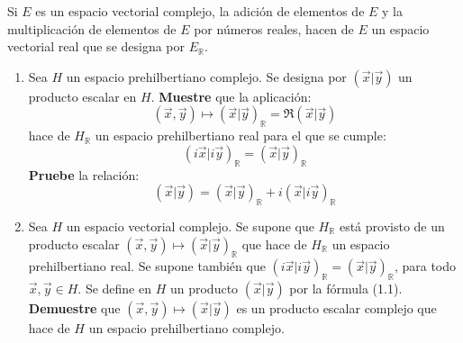 \documentclass[12pt]{report}
\newcounter{it}
\theoremstyle{largebreak}
\newcommand\pint[2]{\ensuremath{\left(#1\big|#2\right)}}
\begin{document}
    \begin{excer}
        Si $E$ es un espacio vectorial complejo, la adición de elementos de $E$ y la multiplicación de elementos de $E$ por números reales, hacen de $E$ un espacio vectorial real que se designa por $E_\mathbb{R}$.
        \begin{enumerate}
            \item Sea $H$ un espacio prehilbertiano complejo. Se designa por $\pint{\vec{x}}{\vec{y}}$ un producto escalar en $H$. \textbf{Muestre} que la aplicación:
            \begin{equation*}
                (\vec{x},\vec{y})\mapsto\pint{\vec{x}}{\vec{y}}_\mathbb{R}=\Re\pint{\vec{x}}{\vec{y}}
            \end{equation*}
            hace de $H_\mathbb{R}$ un espacio prehilbertiano real para el que se cumple:
            \begin{equation*}
                \pint{i\vec{x}}{i\vec{y}}_\mathbb{R}=\pint{\vec{x}}{\vec{y}}_\mathbb{R}
            \end{equation*}
            \textbf{Pruebe} la relación:
            \begin{equation}
                \pint{\vec{x}}{\vec{y}}=\pint{\vec{x}}{\vec{y}}_\mathbb{R}+i\pint{\vec{x}}{i\vec{y}}_\mathbb{R}
            \end{equation}
            \item Sea $H$ un espacio vectorial complejo. Se supone que $H_\mathbb{R}$ está provisto de un producto escalar $(\vec{x},\vec{y})\mapsto\pint{\vec{x}}{\vec{y}}_\mathbb{R}$ que hace de $H_\mathbb{R}$ un espacio prehilbertiano real. Se supone también que $\pint{i\vec{x}}{i\vec{y}}_\mathbb{R}=\pint{\vec{x}}{\vec{y}}_\mathbb{R}$, para todo $\vec{x},\vec{y}\in H$. Se define en $H$ un producto $\pint{\vec{x}}{\vec{y}}$ por la fórmula (1.1). \textbf{Demuestre} que $(\vec{x},\vec{y})\mapsto\pint{\vec{x}}{\vec{y}}$ es un producto escalar complejo que hace de $H$ un espacio prehilbertiano complejo. 
        \end{enumerate}
    \end{excer}
\end{document}
